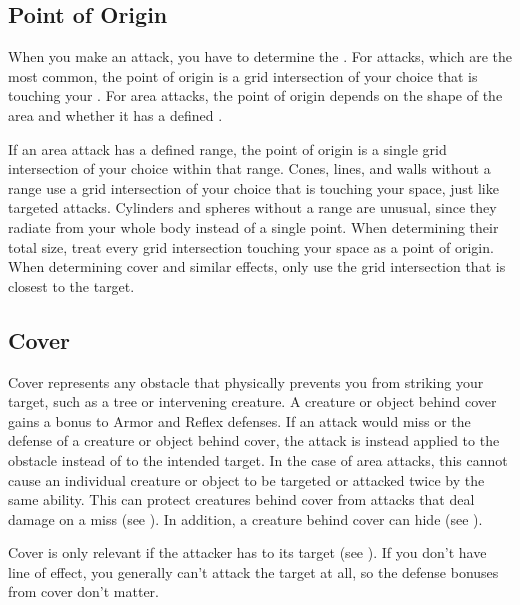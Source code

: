   \subsection{Point of Origin}\label{Point of Origin}
    When you make an attack, you have to determine the .
    For  attacks, which are the most common, the point of origin is a grid intersection of your choice that is touching your .
    For area attacks, the point of origin depends on the shape of the area and whether it has a defined .

    If an area attack has a defined range, the point of origin is a single grid intersection of your choice within that range.
    Cones, lines, and walls without a range use a grid intersection of your choice that is touching your space, just like targeted attacks.
    Cylinders and spheres without a range are unusual, since they radiate from your whole body instead of a single point.
    When determining their total size, treat every grid intersection touching your space as a point of origin.
    When determining cover and similar effects, only use the grid intersection that is closest to the target.

  \subsection{Cover}\label{Cover}

    Cover represents any obstacle that physically prevents you from striking your target, such as a tree or intervening creature.
    A creature or object behind cover gains a  bonus to Armor and Reflex defenses.
    If an attack would miss or  the defense of a creature or object behind cover,
    the attack is instead applied to the obstacle instead of to the intended target.
    In the case of area attacks, this cannot cause an individual creature or object to be targeted or attacked twice by the same ability.
    This can protect creatures behind cover from attacks that deal damage on a miss (see ).
    In addition, a creature behind cover can hide (see ).

    Cover is only relevant if the attacker has  to its target (see ).
    If you don't have line of effect, you generally can't attack the target at all, so the defense bonuses from cover don't matter.

